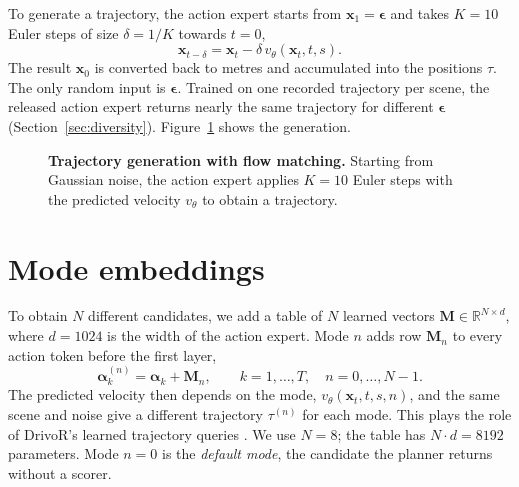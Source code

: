 \documentclass[11pt, a4paper, oneside]{book}
\begin{document}
To generate a trajectory, the action expert starts from $\mathbf{x}_1=\boldsymbol{\epsilon}$
and takes $K=10$ Euler steps of size $\delta=1/K$ towards $t=0$,
\begin{equation}
  \mathbf{x}_{t-\delta}=\mathbf{x}_t-\delta\,v_\theta(\mathbf{x}_t,t,s) .
\end{equation}
The result $\mathbf{x}_0$ is converted back to metres and accumulated into the positions
$\tau$. The only random input is $\boldsymbol{\epsilon}$. Trained on one recorded trajectory
per scene, the released action expert returns nearly the same trajectory for different
$\boldsymbol{\epsilon}$ (Section~\ref{sec:diversity}). Figure~\ref{fig:flow} shows the
generation.

\begin{figure}[t]
\centering
{}
\caption[Trajectory generation with flow matching]{\textbf{Trajectory generation with flow
matching.} Starting from Gaussian noise, the action expert applies $K=10$ Euler steps with the
predicted velocity $v_\theta$ to obtain a trajectory.}
\label{fig:flow}
\end{figure}

\section{Mode embeddings}
\label{sec:modes}
To obtain $N$ different candidates, we add a table of $N$ learned vectors
$\mathbf{M}\in\mathbb{R}^{N\times d}$, where $d=1024$ is the width of the action expert. Mode
$n$ adds row $\mathbf{M}_n$ to every action token before the first layer,
\begin{equation}
  \boldsymbol{\alpha}^{(n)}_k=\boldsymbol{\alpha}_k+\mathbf{M}_n,\qquad k=1,\dots,T,\quad
  n=0,\dots,N-1.
\end{equation}
The predicted velocity then depends on the mode, $v_\theta(\mathbf{x}_t,t,s,n)$, and the same
scene and noise give a different trajectory $\tau^{(n)}$ for each mode. This plays the role of
DrivoR's learned trajectory queries \cite{drivor}. We use $N=8$; the table has
$N\cdot d=\num{8192}$ parameters. Mode $n=0$ is the \emph{default mode}, the candidate the
planner returns without a scorer.
\end{document}

